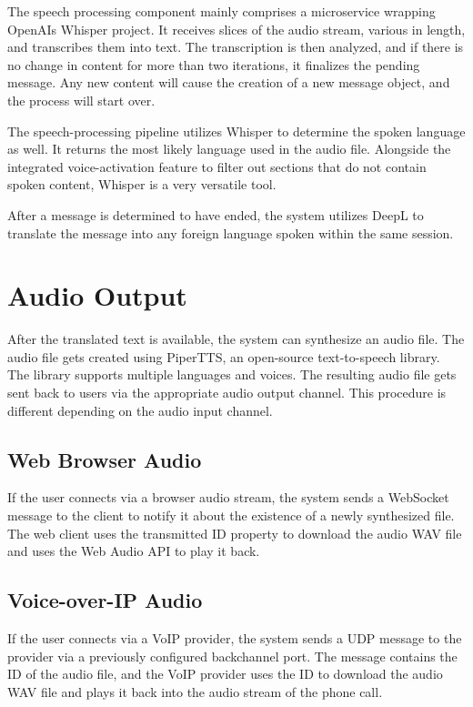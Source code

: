 The speech processing component mainly comprises a microservice wrapping OpenAIs Whisper project. It receives slices of 
the audio stream, various in length, and transcribes them into text. The transcription is then analyzed, and if there 
is no change in content for more than two iterations, it finalizes the pending message. Any new content will cause the 
creation of a new message object, and the process will start over.

The speech-processing pipeline utilizes Whisper to determine the spoken language as well. It returns the most likely 
language used in the audio file. Alongside the integrated voice-activation feature to filter out sections that do not 
contain spoken content, Whisper is a very versatile tool.

After a message is determined to have ended, the system utilizes DeepL to translate the message into any foreign 
language spoken within the same session.


\section{Audio Output}

After the translated text is available, the system can synthesize an audio file. The audio file gets created 
using PiperTTS, an open-source text-to-speech library. The library supports multiple languages and voices. The 
resulting audio file gets sent back to users via the appropriate audio output channel. This procedure is different 
depending on the audio input channel.

\subsection{Web Browser Audio}

If the user connects via a browser audio stream, the system sends a WebSocket message to the client to notify it about 
the existence of a newly synthesized file. The web client uses the transmitted ID property to download the audio WAV 
file and uses the Web Audio API to play it back.

\subsection{Voice-over-IP Audio}
If the user connects via a VoIP provider, the system sends a UDP message to the provider via a previously configured 
backchannel port. The message contains the ID of the audio file, and the VoIP provider uses the ID to download the 
audio WAV file and plays it back into the audio stream of the phone call.

